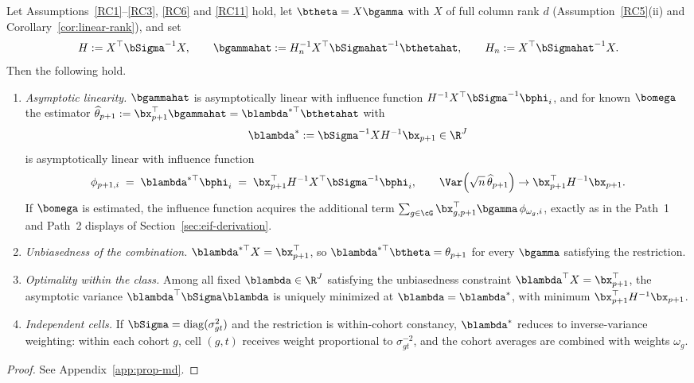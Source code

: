 \documentclass{article}
\begin{document}
\begin{proposition}\label{prop:md-aggregation}
Let Assumptions~\ref{RC1}--\ref{RC3}, \ref{RC6} and \ref{RC11} hold, let $\btheta = X\bgamma$ with $X$ of full column rank $d$ (Assumption~\ref{RC5}(ii) and Corollary~\ref{cor:linear-rank}), and set
\[
H := X^{\top}\bSigma^{-1}X,
\qquad
\bgammahat := H_n^{-1}X^{\top}\bSigmahat^{-1}\bthetahat,
\qquad
H_n := X^{\top}\bSigmahat^{-1}X .
\]
Then the following hold.
\begin{enumerate}
\item[(i)] \emph{Asymptotic linearity.} $\bgammahat$ is asymptotically linear with influence function $H^{-1}X^{\top}\bSigma^{-1}\bphi_i$, and for known $\bomega$ the estimator $\widehat{\theta}_{p+1} := \bx_{p+1}^{\top}\bgammahat = \blambda^{*\top}\bthetahat$ with
\[
\blambda^{*} := \bSigma^{-1}X H^{-1}\bx_{p+1} \in \R^{J}
\]
is asymptotically linear with influence function
\[
\phi_{p+1,i} \;=\; \blambda^{*\top}\bphi_i \;=\; \bx_{p+1}^{\top}H^{-1}X^{\top}\bSigma^{-1}\bphi_i,
\qquad
\Var\!\left(\sqrt n\,\widehat{\theta}_{p+1}\right) \to \bx_{p+1}^{\top}H^{-1}\bx_{p+1}.
\]
If $\bomega$ is estimated, the influence function acquires the additional term $\sum_{g\in\cG} \bx_{g,p+1}^{\top}\bgamma\,\phi_{\omega_g,i}$, exactly as in the Path~1 and Path~2 displays of Section~\ref{sec:eif-derivation}.
\item[(ii)] \emph{Unbiasedness of the combination.} $\blambda^{*\top}X = \bx_{p+1}^{\top}$, so $\blambda^{*\top}\btheta = \theta_{p+1}$ for every $\bgamma$ satisfying the restriction.
\item[(iii)] \emph{Optimality within the class.} Among all fixed $\blambda \in \R^{J}$ satisfying the unbiasedness constraint $\blambda^{\top}X = \bx_{p+1}^{\top}$, the asymptotic variance $\blambda^{\top}\bSigma\blambda$ is uniquely minimized at $\blambda = \blambda^{*}$, with minimum $\bx_{p+1}^{\top}H^{-1}\bx_{p+1}$.
\item[(iv)] \emph{Independent cells.} If $\bSigma = \mathrm{diag}(\sigma^2_{gt})$ and the restriction is within-cohort constancy, $\blambda^{*}$ reduces to inverse-variance weighting: within each cohort $g$, cell $(g,t)$ receives weight proportional to $\sigma_{gt}^{-2}$, and the cohort averages are combined with weights $\omega_g$.
\end{enumerate}
\end{proposition}

\begin{proof}
See Appendix~\ref{app:prop-md}.
\end{proof}
\end{document}
